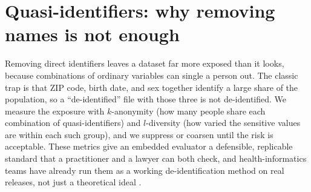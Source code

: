 \section{Quasi-identifiers: why removing names is not enough}\label{sec:qid}
Removing direct identifiers leaves a dataset far more exposed than it looks, because combinations of ordinary variables can single a person out. The classic trap is that ZIP code, birth date, and sex together identify a large share of the population, so a \enquote{de-identified} file with those three is not de-identified. We measure the exposure with $k$-anonymity (how many people share each combination of quasi-identifiers) and $l$-diversity (how varied the sensitive values are within each such group), and we suppress or coarsen until the risk is acceptable. These metrics give an embedded evaluator a defensible, replicable standard that a practitioner and a lawyer can both check, and health-informatics teams have already run them as a working de-identification method on real releases, not just a theoretical ideal \parencite{elemam2008kanon}.

